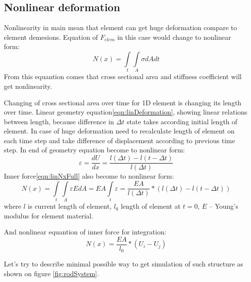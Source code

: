 \subsection*{Nonlinear deformation}
Nonlinearity in main mean that element can get huge deformation compare to
element demesions. Equation of $F_{elem}$ in this case  would change to
nonlinear form:
\begin{equation}\label{eqn:nonlinNx}
  N(x)= \int\limits_t\int\limits_A \sigma dAdt
\end{equation}
From this equantion comes that cross sectional area and stiffness coefficient
will get nonlinearity.
 \par
Changing of cross sectional area over time for 1D element is changing its length
over time. Linear geometry equation\eqref{eqn:linDeformation}, showing linear
relations between length, because difference in $\Delta t$ state takes according
initial length of element. In case of huge deformation need to recalculate
length of element on each time step and take difference of displacement
according to previous time step. In end of geometry equation become to nonlinear
form:
\begin{equation}\label{eqn:nonlinDeformation}
  \varepsilon=\frac{dU}{dx}=\frac{l(\Delta t)-l(t-\Delta t)}{l(\Delta t)}
\end{equation}
Inner force\eqref{eqn:linNxFull} also become to nonlinear form:
\begin{equation}\label{eqn:nonlinNxFull}
  N(x)= \int\limits_t\int\limits_A \varepsilon EdA=EA\int\limits_t\varepsilon=\frac{EA}{l(\Delta t)}*(l(\Delta t)-l(t-\Delta t))
\end{equation}
where $l$ is current length of element, $l_0$ length of element at $t=0$, $E$ –
Young’s modulus for element material.\par And nonlinear equantion of inner force
for integration:
\begin{equation}\label{eqn:nonlinNxWdispl}
  N(x)=\frac{EA}{l_0}*(U_{i}-U_{j})
\end{equation}\par

\par
Let's try to describe minimal possible way to get simulation of such structure
 as shown on figure \ref{fig:rodSystem}. 

